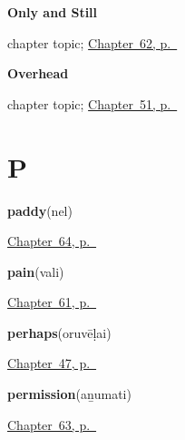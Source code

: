 \noindent\begin{minipage}[t]{\linewidth}
\raggedright
\textbf{Only and Still}\par
\footnotesize chapter topic; \hyperref[ch:ta-only-and-still]{Chapter~62, p.~\pageref*{ch:ta-only-and-still}}
\end{minipage}\par\smallskip

\noindent\begin{minipage}[t]{\linewidth}
\raggedright
\textbf{Overhead}\par
\footnotesize chapter topic; \hyperref[ch:ta-overhead]{Chapter~51, p.~\pageref*{ch:ta-overhead}}
\end{minipage}\par\smallskip

\section*{P}

\noindent\begin{minipage}[t]{\linewidth}
\raggedright
\textbf{paddy}\enspace\emph{}\enspace(nel)\par
\footnotesize \hyperref[ch:ta-the-harvest]{Chapter~64, p.~\pageref*{ch:ta-the-harvest}}
\end{minipage}\par\smallskip

\noindent\begin{minipage}[t]{\linewidth}
\raggedright
\textbf{pain}\enspace\emph{}\enspace(vali)\par
\footnotesize \hyperref[ch:ta-how-the-body-feels]{Chapter~61, p.~\pageref*{ch:ta-how-the-body-feels}}
\end{minipage}\par\smallskip

\noindent\begin{minipage}[t]{\linewidth}
\raggedright
\textbf{perhaps}\enspace\emph{}\enspace(oruvēḷai)\par
\footnotesize \hyperref[ch:ta-replies]{Chapter~47, p.~\pageref*{ch:ta-replies}}
\end{minipage}\par\smallskip

\noindent\begin{minipage}[t]{\linewidth}
\raggedright
\textbf{permission}\enspace\emph{}\enspace(aṉumati)\par
\footnotesize \hyperref[ch:ta-asking-well]{Chapter~63, p.~\pageref*{ch:ta-asking-well}}
\end{minipage}\par\smallskip

